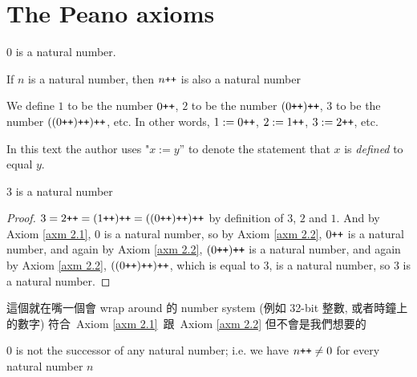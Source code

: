 \section{The Peano axioms}\label{sec 2.1}

\begin{axiom}\label{axm 2.1}
\( 0 \) is a natural number.
\end{axiom}
\begin{axiom}\label{axm 2.2}
If \( n \) is a natural number, then \( n\texttt{++} \) is also a natural number
\end{axiom}

\setcounter{theorem}{2}
\begin{definition}\label{def 2.1.3}
We define \( 1 \) to be the number \( 0\texttt{++} \), \(2\) to be the number \( (0\texttt{++})\texttt{++} \), 3 to be the number \( ((0\texttt{++})\texttt{++})\texttt{++} \), etc. In other words, \( 1 := 0\texttt{++} \), \( 2 := 1\texttt{++} \), \( 3 := 2\texttt{++} \), etc.
\end{definition}

\begin{note}
In this text the author uses "\(x := y\)” to denote the statement that \(x\) is \emph{defined} to equal \(y\).
\end{note}

\begin{proposition}\label{prop 2.1.4}
3 is a natural number
\begin{proof}
\( 3 = 2\texttt{++} = (1\texttt{++})\texttt{++} = ((0\texttt{++})\texttt{++})\texttt{++} \) by definition of \(3\), \(2\) and \(1\). And by Axiom \ref{axm 2.1}, \(0\) is a natural number, so by Axiom \ref{axm 2.2}, \(0\texttt{++}\) is a natural number, and again by Axiom \ref{axm 2.2}, \((0\texttt{++})\texttt{++}\) is a natural number, and again by Axiom \ref{axm 2.2}, \( ((0\texttt{++})\texttt{++})\texttt{++} \), which is equal to \(3\), is a natural number, so \(3\) is a natural number.
\end{proof}
\end{proposition}

\begin{example}\label{example 2.1.5}
這個就在嘴一個會 wrap around 的 number system (例如 32-bit 整數, 或者時鐘上的數字) 符合\ Axiom \ref{axm 2.1}\ 跟\ Axiom \ref{axm 2.2} 但不會是我們想要的
\end{example}

\begin{axiom}\label{axm 2.3}
\(0\) is not the successor of any natural number; i.e. we have \(n\texttt{++} \neq 0\) for every natural number \(n\)
\end{axiom}


